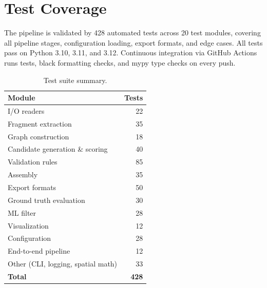 \section{Test Coverage}

The pipeline is validated by 428 automated tests across 20 test modules,
covering all pipeline stages, configuration loading, export formats, and edge
cases. All tests pass on Python 3.10, 3.11, and 3.12. Continuous integration
via GitHub Actions runs tests, black formatting checks, and mypy type checks on
every push.

\begin{table}[H]
\centering
\caption{Test suite summary.}
\label{tab:tests}
\begin{tabular}{@{}lr@{}}
\toprule
Module & Tests \\
\midrule
I/O readers & 22 \\
Fragment extraction & 35 \\
Graph construction & 18 \\
Candidate generation \& scoring & 40 \\
Validation rules & 85 \\
Assembly & 35 \\
Export formats & 50 \\
Ground truth evaluation & 30 \\
ML filter & 28 \\
Visualization & 12 \\
Configuration & 28 \\
End-to-end pipeline & 12 \\
Other (CLI, logging, spatial math) & 33 \\
\midrule
\textbf{Total} & \textbf{428} \\
\bottomrule
\end{tabular}
\end{table}
